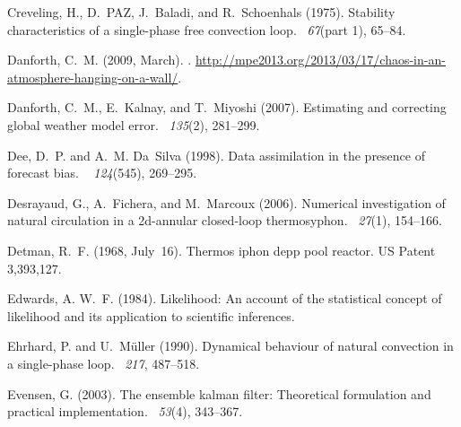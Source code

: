 \documentclass[12pt]{report}
\begin{document}
\begin{thebibliography}{}
Creveling, H., D.~PAZ, J.~Baladi, and R.~Schoenhals (1975).
\newblock Stability characteristics of a single-phase free convection loop.
~{\em 67\/}(part 1), 65--84.

Danforth, C.~M. (2009, March).
.
\newblock
  \url{http://mpe2013.org/2013/03/17/chaos-in-an-atmosphere-hanging-on-a-wall/}.

Danforth, C.~M., E.~Kalnay, and T.~Miyoshi (2007).
\newblock Estimating and correcting global weather model error.
~{\em 135\/}(2), 281--299.

Dee, D.~P. and A.~M. Da~Silva (1998).
\newblock Data assimilation in the presence of forecast bias.
~{\em
  124\/}(545), 269--295.

Desrayaud, G., A.~Fichera, and M.~Marcoux (2006).
\newblock Numerical investigation of natural circulation in a 2d-annular
  closed-loop thermosyphon.
~{\em 27\/}(1),
  154--166.

Detman, R.~F. (1968, July~16).
\newblock Thermos iphon depp pool reactor.
\newblock US Patent 3,393,127.

Edwards, A. W.~F. (1984).
\newblock Likelihood: An account of the statistical concept of likelihood and
  its application to scientific inferences.

Ehrhard, P. and U.~M{\"u}ller (1990).
\newblock Dynamical behaviour of natural convection in a single-phase loop.
~{\em 217}, 487--518.

Evensen, G. (2003).
\newblock The ensemble kalman filter: Theoretical formulation and practical
  implementation.
~{\em 53\/}(4), 343--367.


\end{thebibliography}
\end{document}
